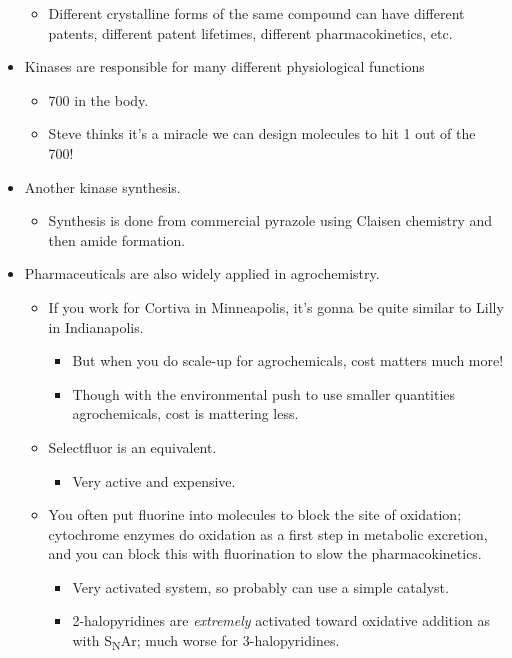 \documentclass[../notes.tex]{subfiles}
\begin{document}
\begin{itemize}
\begin{itemize}
        \item Different crystalline forms of the same compound can have different patents, different patent lifetimes, different pharmacokinetics, etc.
    \end{itemize}
    \pagebreak
    \item Kinases are responsible for many different physiological functions
    \begin{itemize}
        \item 700 in the body.
        \item Steve thinks it's a miracle we can design molecules to hit 1 out of the 700!
    \end{itemize}
    \item Another kinase synthesis.
    \begin{itemize}
        \item Synthesis is done from commercial pyrazole using Claisen chemistry and then amide formation.
    \end{itemize}
    \item Pharmaceuticals are also widely applied in agrochemistry.
    \begin{itemize}
        \item If you work for Cortiva in Minneapolis, it's gonna be quite similar to Lilly in Indianapolis.
        \begin{itemize}
            \item But when you do scale-up for agrochemicals, cost matters much more!
            \item Though with the environmental push to use smaller quantities agrochemicals, cost is mattering less.
        \end{itemize}
        \item Selectfluor is an  equivalent.
        \begin{itemize}
            \item Very active and expensive.
        \end{itemize}
        \item You often put fluorine into molecules to block the site of oxidation; cytochrome enzymes do  oxidation as a first step in metabolic excretion, and you can block this with fluorination to slow the pharmacokinetics.
        \begin{itemize}
            \item Very activated system, so probably can use a simple catalyst.
            \item 2-halopyridines are \emph{extremely} activated toward oxidative addition as with S\textsubscript{N}Ar; much worse for 3-halopyridines.

\end{itemize}
\end{itemize}
\end{itemize}
\end{document}
